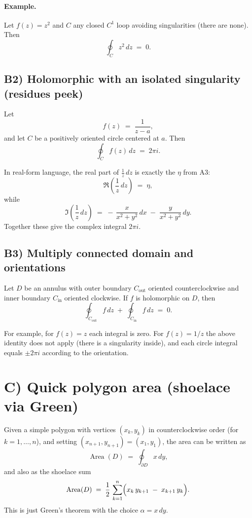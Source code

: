 \documentclass[11pt]{article}
\begin{document}
\paragraph{Example.}
Let $f(z)=z^{2}$ and $C$ any closed $C^{1}$ loop avoiding singularities (there are none). Then
\[
\oint_{C} z^{2}\,dz \;=\; 0.
\]

\subsection*{B2) Holomorphic with an isolated singularity (residues peek)}

Let
\[
f(z) \;=\; \frac{1}{z - a},
\]
and let $C$ be a positively oriented circle centered at $a$. Then
\[
\oint_{C} f(z)\,dz \;=\; 2\pi i.
\]

In real-form language, the real part of $\frac{1}{z}\,dz$ is exactly the $\eta$ from A3:
\[
\Re\!\left(\frac{1}{z}\,dz\right) \;=\; \eta,
\]
while
\[
\Im\!\left(\frac{1}{z}\,dz\right) \;=\; -\,\frac{x}{x^{2}+y^{2}}\,dx \;-\; \frac{y}{x^{2}+y^{2}}\,dy.
\]
Together these give the complex integral $2\pi i$.

\subsection*{B3) Multiply connected domain and orientations}

Let $D$ be an annulus with outer boundary $C_{\text{out}}$ oriented counterclockwise and inner boundary $C_{\text{in}}$ oriented clockwise. If $f$ is holomorphic on $D$, then
\[
\oint_{C_{\text{out}}} f\,dz \;+\; \oint_{C_{\text{in}}} f\,dz \;=\; 0.
\]

For example, for $f(z)=z$ each integral is zero. For $f(z)=1/z$ the above identity does not apply (there is a singularity inside), and each circle integral equals $\pm 2\pi i$ according to the orientation.

\section*{C) Quick polygon area (shoelace via Green)}

Given a simple polygon with vertices $(x_{k},y_{k})$ in counterclockwise order (for $k=1,\dots,n$), and setting $(x_{n+1},y_{n+1})=(x_{1},y_{1})$, the area can be written as
\[
\operatorname{Area}(D) \;=\; \oint_{\partial D} x\,dy,
\]
and also as the shoelace sum
\[
\operatorname{Area}(D) \;=\; \frac{1}{2}\,\sum_{k=1}^{n} \Bigl(x_{k}\,y_{k+1} \;-\; x_{k+1}\,y_{k}\Bigr).
\]
This is just Green's theorem with the choice $\alpha = x\,dy$.
\end{document}
